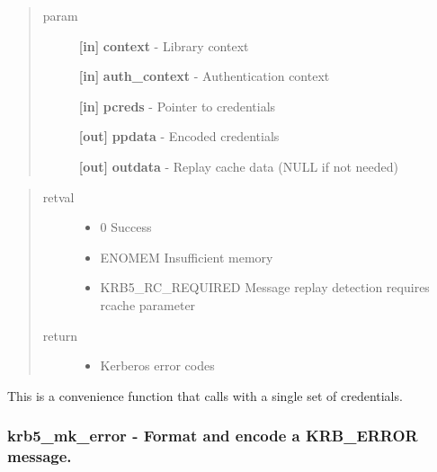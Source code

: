 \documentclass[letterpaper,10pt,english]{sphinxmanual}
\begin{document}
\begin{quote}\begin{description}
\item[{param}] \leavevmode
\textbf{{[}in{]}} \textbf{context} - Library context

\textbf{{[}in{]}} \textbf{auth\_context} - Authentication context

\textbf{{[}in{]}} \textbf{pcreds} - Pointer to credentials

\textbf{{[}out{]}} \textbf{ppdata} - Encoded credentials

\textbf{{[}out{]}} \textbf{outdata} - Replay cache data (NULL if not needed)

\end{description}\end{quote}
\begin{quote}\begin{description}
\item[{retval}] \leavevmode\begin{itemize}
\item {} 
0   Success

\item {} 
ENOMEM   Insufficient memory

\item {} 
KRB5\_RC\_REQUIRED   Message replay detection requires rcache parameter

\end{itemize}

\item[{return}] \leavevmode\begin{itemize}
\item {} 
Kerberos error codes

\end{itemize}

\end{description}\end{quote}

This is a convenience function that calls {\hyperref[appdev/refs/api/krb5_mk_ncred:krb5_mk_ncred]{}} with a single set of credentials.


\subsubsection{krb5\_mk\_error -  Format and encode a KRB\_ERROR message.}
\label{appdev/refs/api/krb5_mk_error:krb5-mk-error-format-and-encode-a-krb-error-message}\label{appdev/refs/api/krb5_mk_error::doc}
\end{document}
